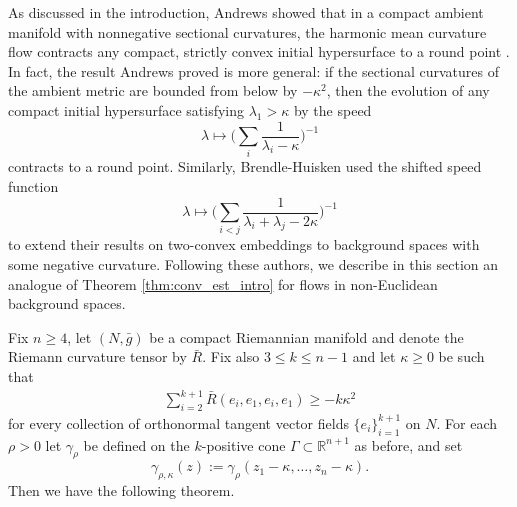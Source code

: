 \documentclass[12pt]{amsart}
\begin{document}
As discussed in the introduction, Andrews showed that in a compact ambient manifold with nonnegative sectional curvatures, the harmonic mean curvature flow contracts any compact, strictly convex initial hypersurface to a round point \cite{And94}. In fact, the result Andrews proved is more general: if the sectional curvatures of the ambient metric are bounded from below by $-\kappa^2$, then the evolution of any compact initial hypersurface satisfying $\lambda_1 > \kappa$ by the speed 
\[\lambda \mapsto \bigg( \sum_i \frac{1}{\lambda_i - \kappa}\bigg)^{-1}\]
contracts to a round point. Similarly, Brendle-Huisken \cite{Bren-Huisk17} used the shifted speed function 
\[\lambda \mapsto \bigg( \sum_{ i<j} \frac{1}{\lambda_i +\lambda_j - 2\kappa}\bigg)^{-1}\]
to extend their results on two-convex embeddings to background spaces with some negative curvature. Following these authors, we describe in this section an analogue of Theorem \ref{thm:conv_est_intro} for flows in non-Euclidean background spaces.

Fix $n \geq 4$, let $(N,\bar g)$ be a compact Riemannian manifold and denote the Riemann curvature tensor by $\bar R$. Fix also $3 \leq k \leq n-1$ and let $\kappa \geq 0$ be such that 
\begin{align}
\label{eq:backg_pinch}
 \sum_{i=2}^{k+1}\bar R(e_i, e_1, e_i, e_1) \geq -k\kappa^2
\end{align}
for every collection of orthonormal tangent vector fields $\{e_i\}_{i=1}^{k+1}$ on $N$. For each $\rho >0$ let $\gamma_\rho$ be defined on the $k$-positive cone $\Gamma\subset \mathbb{R}^{n+1}$ as before, and set
\[\gamma_{\rho,\kappa} (z) := \gamma_{\rho}(z_1 - \kappa, \dots, z_n - \kappa).\]
Then we have the following theorem. 
\end{document}
